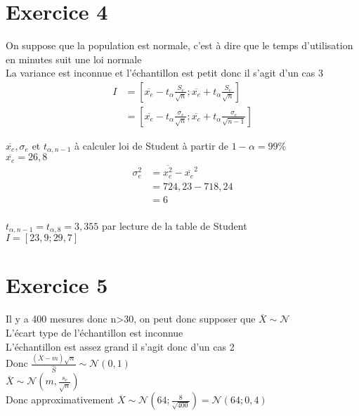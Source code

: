 \documentclass[12pt]{report}
\begin{document}
\section{Exercice 4}
On suppose que la population est normale, c'est à dire que le temps d'utilisation en minutes suit une loi normale\\
La variance est inconnue et l'échantillon est petit donc il s'agit d'un cas 3
\begin{align*}
    I &= [\overline{x_e} - t_\alpha \frac{S_e}{\sqrt{n}}; \overline{x_e} + t_\alpha \frac{S_e}{\sqrt{n}}]\\
    &= [\overline{x_e} - t_\alpha \frac{\sigma_e}{\sqrt{n}}; \overline{x_e} + t_\alpha \frac{\sigma_e}{\sqrt{n-1}}]
\end{align*}

$\overline{x_e},\sigma_e$ et $t_{\alpha,n-1}$ à calculer  
loi de Student à partir de $1-\alpha = 99 \%$\\
$\overline{x_e} =26,8$\\
\begin{align*}
    \sigma_e^2 &= \overline{x_e^2} - \overline{x_e}^2\\
    &= 724,23 - 718,24\\
    &=6\\
\end{align*}

$t_{\alpha,n-1} = t_{\alpha,8} = 3,355$ par lecture de la table de Student\\
$I = [23,9;29,7]$

\section{Exercice 5}

Il y a 400 mesures donc n>30, on peut donc supposer que $\overline{X} \sim \mathcal{N}$\\
L'écart type de l'échantillon est inconnue\\
L'échantillon est assez grand il s'agit donc d'un cas 2\\
Donc $\frac{(\overline{X}-m)\sqrt{n}}{\hat{S}} \sim \mathcal{N}(0,1)$\\
$\overline{X} \sim \mathcal{N}(m,\frac{s_e}{\sqrt{n}})$\\
Donc approximativement $\overline{X} \sim \mathcal{N}(64;\frac{8}{\sqrt{400}}) = \mathcal{N}(64;0,4)$\\
\end{document}
